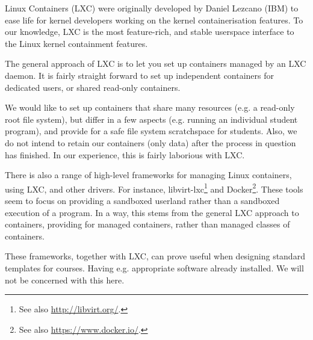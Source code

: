 Linux Containers (LXC) were originally developed by Daniel Lezcano (IBM) to
ease life for kernel developers working on the kernel containerisation
features\cite{lxc-v1.0.3}. To our knowledge, LXC is the most feature-rich, and
stable userspace interface to the Linux kernel containment
features\cite{graber-2014}.

The general approach of LXC is to let you set up containers managed by an LXC
daemon. It is fairly straight forward to set up independent containers for
dedicated users, or shared read-only containers.

We would like to set up containers that share many resources (e.g. a read-only
root file system), but differ in a few aspects (e.g. running an individual
student program), and provide for a safe file system scratchspace for students.
Also, we do not intend to retain our containers (only data) after the process
in question has finished. In our experience, this is fairly laborious with LXC.

There is also a range of high-level frameworks for managing Linux containers,
using LXC, and other drivers. For instance, libvirt-lxc\footnote{See also
\url{http://libvirt.org/}.} and Docker\footnote{See also
\url{https://www.docker.io/}.}. These tools seem to focus on providing a
sandboxed userland rather than a sandboxed execution of a program. In a way,
this stems from the general LXC approach to containers, providing for managed
containers, rather than managed classes of containers.

These frameworks, together with LXC, can prove useful when designing standard
templates for courses. Having e.g. appropriate software already installed. We
will not be concerned with this here.
